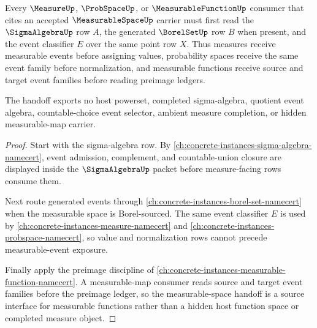 \begin{theorem}
\label{thm:measurable-space-sigma-algebra-handoff}
Every $\MeasureUp$, $\ProbSpaceUp$, or $\MeasurableFunctionUp$ consumer that cites an accepted $\MeasurableSpaceUp$ carrier must first read the $\SigmaAlgebraUp$ row $A$, the generated $\BorelSetUp$ row $B$ when present, and the event classifier $E$ over the same point row $X$. Thus measures receive measurable events before assigning values, probability spaces receive the same event family before normalization, and measurable functions receive source and target event families before reading preimage ledgers.

The handoff exports no host powerset, completed sigma-algebra, quotient event algebra, countable-choice event selector, ambient measure completion, or hidden measurable-map carrier.
\end{theorem}
\begin{proof}
Start with the sigma-algebra row. By \autoref{ch:concrete-instances-sigma-algebra-namecert}, event admission, complement, and countable-union closure are displayed inside the $\SigmaAlgebraUp$ packet before measure-facing rows consume them.

Next route generated events through \autoref{ch:concrete-instances-borel-set-namecert} when the measurable space is Borel-sourced. The same event classifier $E$ is used by \autoref{ch:concrete-instances-measure-namecert} and \autoref{ch:concrete-instances-probspace-namecert}, so value and normalization rows cannot precede measurable-event exposure.

Finally apply the preimage discipline of \autoref{ch:concrete-instances-measurable-function-namecert}. A measurable-map consumer reads source and target event families before the preimage ledger, so the measurable-space handoff is a source interface for measurable functions rather than a hidden host function space or completed measure object.
\end{proof}



